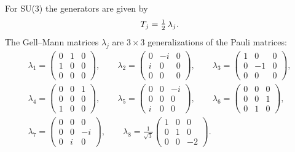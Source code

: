 For SU(3) the generators are given by
\begin{equation}
  T_j = \tfrac{1}{2}\,\lambda_j .
\end{equation}
The Gell--Mann matrices $\lambda_j$ are $3\times 3$ generalizations of the
Pauli matrices:
\begin{equation}
  \begin{gathered}
    \lambda_1 = \begin{pmatrix} 0 & 1 & 0 \\ 1 & 0 & 0 \\ 0 & 0 & 0 \end{pmatrix},\qquad
    \lambda_2 = \begin{pmatrix} 0 & -i & 0 \\ i & 0 & 0 \\ 0 & 0 & 0 \end{pmatrix},\qquad
    \lambda_3 = \begin{pmatrix} 1 & 0 & 0 \\ 0 & -1 & 0 \\ 0 & 0 & 0 \end{pmatrix},\\[4pt]
    \lambda_4 = \begin{pmatrix} 0 & 0 & 1 \\ 0 & 0 & 0 \\ 1 & 0 & 0 \end{pmatrix},\qquad
    \lambda_5 = \begin{pmatrix} 0 & 0 & -i \\ 0 & 0 & 0 \\ i & 0 & 0 \end{pmatrix},\qquad
    \lambda_6 = \begin{pmatrix} 0 & 0 & 0 \\ 0 & 0 & 1 \\ 0 & 1 & 0 \end{pmatrix},\\[4pt]
    \lambda_7 = \begin{pmatrix} 0 & 0 & 0 \\ 0 & 0 & -i \\ 0 & i & 0 \end{pmatrix},\qquad
    \lambda_8 = \frac{1}{\sqrt{3}}
    \begin{pmatrix} 1 & 0 & 0 \\ 0 & 1 & 0 \\ 0 & 0 & -2 \end{pmatrix}.
  \end{gathered}
\end{equation}

